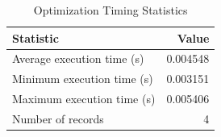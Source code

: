 
\begin{table}[h!]
\centering
\begin{tabular}{l r}
\hline
Statistic & Value \\
\hline
Average execution time (s) & 0.004548 \\
Minimum execution time (s) & 0.003151 \\
Maximum execution time (s) & 0.005406 \\
Number of records & 4 \\
\hline
\end{tabular}
\caption{Optimization Timing Statistics}
\end{table}
